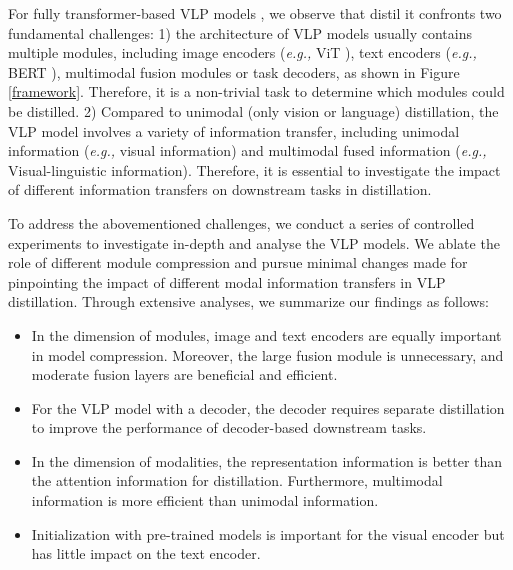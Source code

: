 \documentclass[10pt,twocolumn,letterpaper]{article}
\begin{document}
For fully transformer-based VLP models \cite{kim2021vilt, li2022blip, dou2022empirical},
we observe that distil it confronts two fundamental challenges: 1) the architecture of VLP models usually contains multiple modules, including image encoders (\emph{e.g.,} ViT \cite{radford2021learning}), text encoders (\emph{e.g.,} BERT \cite{vaswani2017attention}), multimodal fusion modules or task decoders, as shown in Figure \ref{framework}.
Therefore, it is a non-trivial task to determine which modules could be distilled. 
2) Compared to unimodal (only vision or language) distillation, 
the VLP model involves a variety of information transfer, including unimodal information (\emph{e.g.,} visual information) and multimodal fused information (\emph{e.g.,} Visual-linguistic information).
Therefore, it is essential to investigate the impact of different information transfers on downstream tasks in distillation.

To address the abovementioned challenges, we conduct a series of controlled experiments to investigate in-depth and analyse the VLP models. We ablate the role of different module compression and pursue minimal changes made for pinpointing the impact of different modal information transfers in VLP distillation.
Through extensive analyses, we summarize our findings as follows:
\begin{itemize}[itemsep=5pt,topsep=5pt,parsep=0pt]
    \item  In the dimension of modules, image and text encoders are equally important in model compression. Moreover, the large fusion module is unnecessary, and moderate fusion layers are beneficial and efficient. 
    \item For the VLP model with a decoder, the decoder requires separate distillation to improve the performance of decoder-based downstream tasks.
    \item  In the dimension of modalities, the representation information is better than the attention information for distillation. Furthermore, multimodal information is more efficient than unimodal information. 
    \item  Initialization with pre-trained models is important for the visual encoder but has little impact on the text encoder. 
\end{itemize}
\end{document}
